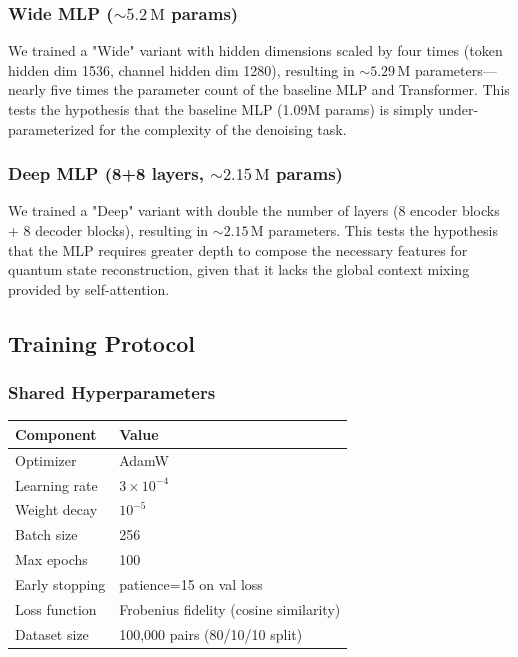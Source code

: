 \documentclass[11pt]{article}
\begin{document}
\subsubsection{Wide MLP (\(\sim 5.2\,\mathrm{M}\) params)}
\label{sec:org45b819d}

We trained a "Wide" variant with hidden dimensions scaled by four times (token hidden dim 1536, channel hidden dim 1280), resulting in \(\sim 5.29\,\mathrm{M}\) parameters---nearly five times the parameter count of the baseline MLP and Transformer. This tests the hypothesis that the baseline MLP (1.09M params) is simply under-parameterized for the complexity of the denoising task.

\subsubsection{Deep MLP (8+8 layers, \(\sim 2.15\,\mathrm{M}\) params)}
\label{sec:org3eabe23}

We trained a "Deep" variant with double the number of layers (8 encoder blocks + 8 decoder blocks), resulting in \(\sim 2.15\,\mathrm{M}\) parameters. This tests the hypothesis that the MLP requires greater depth to compose the necessary features for quantum state reconstruction, given that it lacks the global context mixing provided by self-attention.
\subsection{Training Protocol}
\label{sec:org42e5acf}

\subsubsection{Shared Hyperparameters}
\label{sec:org9364179}

\begin{center}
\begin{tabular}{ll}
Component & Value\\[0pt]
\hline
Optimizer & AdamW\\[0pt]
Learning rate & \(3\times 10^{-4}\)\\[0pt]
Weight decay & \(10^{-5}\)\\[0pt]
Batch size & 256\\[0pt]
Max epochs & 100\\[0pt]
Early stopping & patience=15 on val loss\\[0pt]
Loss function & Frobenius fidelity (cosine similarity)\\[0pt]
Dataset size & 100,000 pairs (80/10/10 split)\\[0pt]
\end{tabular}
\end{center}
\end{document}
